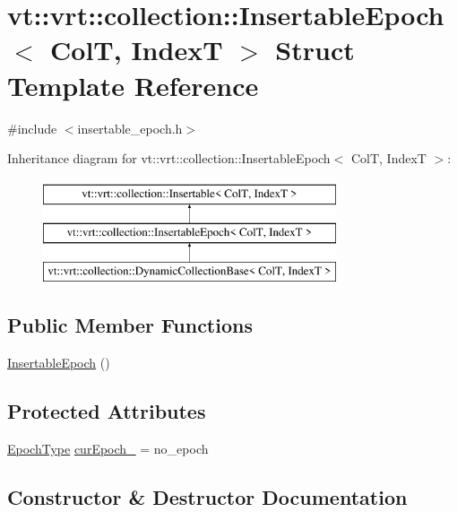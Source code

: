 \hypertarget{structvt_1_1vrt_1_1collection_1_1_insertable_epoch}{}\section{vt\+:\+:vrt\+:\+:collection\+:\+:Insertable\+Epoch$<$ ColT, IndexT $>$ Struct Template Reference}
\label{structvt_1_1vrt_1_1collection_1_1_insertable_epoch}


{\ttfamily \#include $<$insertable\+\_\+epoch.\+h$>$}

Inheritance diagram for vt\+:\+:vrt\+:\+:collection\+:\+:Insertable\+Epoch$<$ ColT, IndexT $>$\+:\begin{figure}[H]
\begin{center}
\leavevmode
\includegraphics[height=3.000000cm]{structvt_1_1vrt_1_1collection_1_1_insertable_epoch}
\end{center}
\end{figure}
\subsection*{Public Member Functions}
\begin{DoxyCompactItemize}
\item 
\hyperlink{structvt_1_1vrt_1_1collection_1_1_insertable_epoch_a9f87fb62b5dd4cde41078ebb09d3b7b4}{Insertable\+Epoch} ()
\end{DoxyCompactItemize}
\subsection*{Protected Attributes}
\begin{DoxyCompactItemize}
\item 
\hyperlink{namespacevt_a985a5adf291c34a3ca263b3378388236}{Epoch\+Type} \hyperlink{structvt_1_1vrt_1_1collection_1_1_insertable_epoch_acaadf611bda2cb1cd810efdac251057d}{cur\+Epoch\+\_\+} = no\+\_\+epoch
\end{DoxyCompactItemize}


\subsection{Constructor \& Destructor Documentation}
\mbox{\label{structvt_1_1vrt_1_1collection_1_1_insertable_epoch_a9f87fb62b5dd4cde41078ebb09d3b7b4}} 
